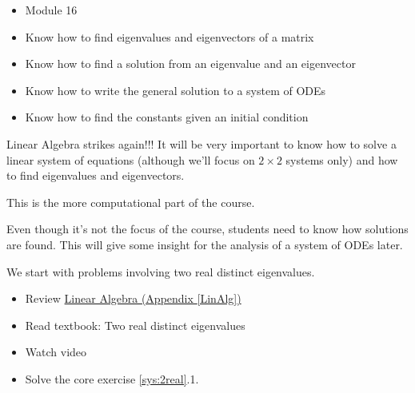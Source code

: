 \begin{lesson}

	\begin{itemize}
		\item Module 16
	\end{itemize}

	\begin{itemize}
		\item Know how to find eigenvalues and eigenvectors of a matrix
		\item Know how to find a solution from an eigenvalue and an eigenvector
		\item Know how to write the general solution to a system of ODEs
		\item Know how to find the constants given an initial condition
	\end{itemize}
	

Linear Algebra strikes again!!! It will be very important to know how to solve a linear system of equations (although we'll focus on $2\times 2$ systems only) and how to find eigenvalues and eigenvectors. 

This is the more computational part of the course. 

Even though it's not the focus of the course, students need to know how solutions are found. This will give some insight for the analysis of a system of ODEs later. 

We start with problems involving two real distinct eigenvalues.

\begin{itemize}
	\item Review \hyperref[LinAlg]{Linear Algebra (Appendix \ref{LinAlg})}
	\item Read textbook: Two real distinct eigenvalues
	\item Watch video
	\item Solve the core exercise \ref{sys:2real}.1.
\end{itemize}

\end{lesson}




